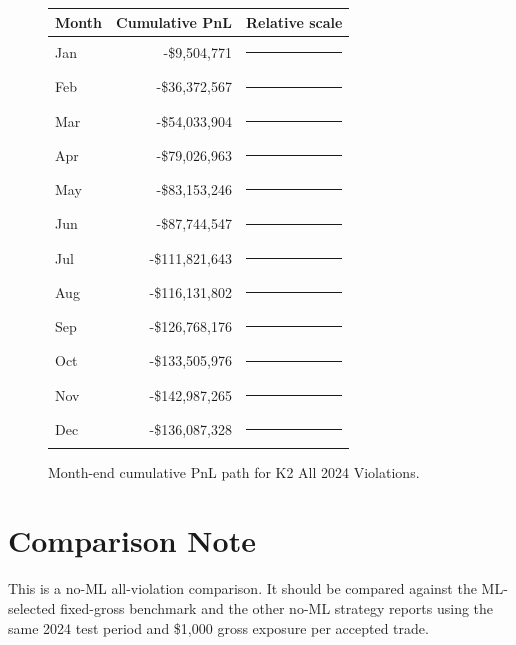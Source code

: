 \documentclass[11pt]{article}
\begin{document}
\begin{figure}[h]
\centering
\begin{tabular}{@{}lrl@{}}
\toprule
Month & Cumulative PnL & Relative scale \\
\midrule
Jan & -\$9,504,771 & \textcolor{red}{\rule{0.7cm}{7pt}}\\
Feb & -\$36,372,567 & \textcolor{red}{\rule{2.5cm}{7pt}}\\
Mar & -\$54,033,904 & \textcolor{red}{\rule{3.8cm}{7pt}}\\
Apr & -\$79,026,963 & \textcolor{red}{\rule{5.5cm}{7pt}}\\
May & -\$83,153,246 & \textcolor{red}{\rule{5.8cm}{7pt}}\\
Jun & -\$87,744,547 & \textcolor{red}{\rule{6.1cm}{7pt}}\\
Jul & -\$111,821,643 & \textcolor{red}{\rule{7.8cm}{7pt}}\\
Aug & -\$116,131,802 & \textcolor{red}{\rule{8.1cm}{7pt}}\\
Sep & -\$126,768,176 & \textcolor{red}{\rule{8.9cm}{7pt}}\\
Oct & -\$133,505,976 & \textcolor{red}{\rule{9.3cm}{7pt}}\\
Nov & -\$142,987,265 & \textcolor{red}{\rule{10.0cm}{7pt}}\\
Dec & -\$136,087,328 & \textcolor{red}{\rule{9.5cm}{7pt}}\\
\bottomrule
\end{tabular}
\caption{Month-end cumulative PnL path for K2 All 2024 Violations.}
\end{figure}

\section{Comparison Note}

This is a no-ML all-violation comparison. It should be compared against the ML-selected fixed-gross benchmark and the other no-ML strategy reports using the same 2024 test period and \$1,000 gross exposure per accepted trade.
\end{document}
